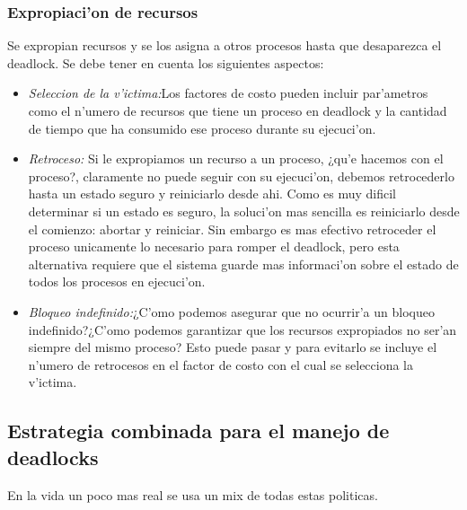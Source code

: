 \subsubsection{Expropiaci'on de recursos}
Se expropian recursos y se los asigna a otros procesos hasta que desaparezca el deadlock. Se debe tener en cuenta los siguientes aspectos:
\begin{itemize}
 \item \textit{Seleccion de la v'ictima:}Los factores de costo pueden incluir par'ametros como el n'umero de recursos que tiene un proceso en deadlock y la cantidad de tiempo que ha consumido ese proceso durante su ejecuci'on.
\item \textit{Retroceso:} Si le expropiamos un recurso a un proceso, ¿qu'e hacemos con el proceso?, claramente no puede seguir con su ejecuci'on, debemos retrocederlo hasta un estado seguro y reiniciarlo desde ahi.
Como es muy dificil determinar si un estado es seguro, la soluci'on mas sencilla es reiniciarlo desde el comienzo: abortar y reiniciar. Sin embargo es mas efectivo retroceder el proceso unicamente lo necesario para romper el deadlock, pero esta alternativa requiere que el sistema guarde mas informaci'on sobre el estado de todos los procesos en ejecuci'on.
\item \textit{Bloqueo indefinido:}¿C'omo podemos asegurar que no ocurrir'a un bloqueo indefinido?¿C'omo podemos garantizar que los recursos expropiados no ser'an siempre del mismo proceso? Esto puede pasar y para evitarlo se incluye el n'umero de retrocesos en el factor de costo con el cual se selecciona la v'ictima.
\end{itemize}

\subsection{Estrategia combinada para el manejo de deadlocks}
En la vida un poco mas real se usa un mix de todas estas politicas.


